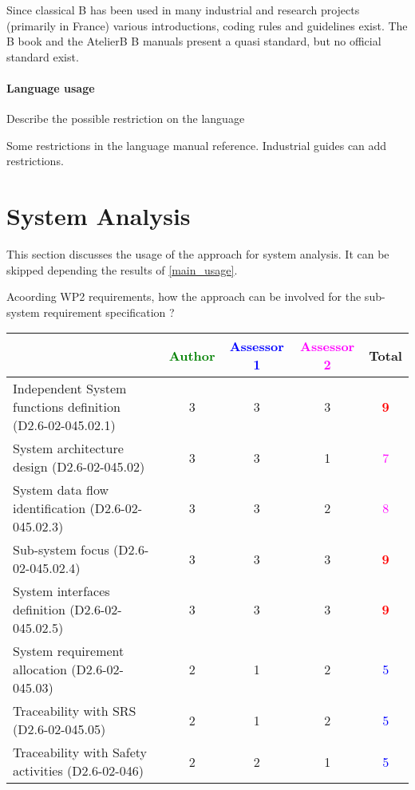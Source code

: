 \begin{assessor2}
Since classical B has been used in many industrial and research projects (primarily in France) various introductions, coding rules and guidelines exist. The B book and the AtelierB B manuals present a quasi standard, but no official standard exist.
\end{assessor2}

\paragraph{Language usage} Describe the possible restriction on the language
\begin{author_comment}
Some restrictions in the language manual reference. Industrial guides can add restrictions.
\end{author_comment}

\section{System Analysis}
This section discusses the usage of the approach for system analysis.
It can be skipped depending the results of \ref{main_usage}.

Acoording WP2 requirements, how the approach can be involved for the sub-system requirement specification ?

\begin{tabular}{|l | c | c | c | c|}
\hline
& \textcolor{green}{Author} & \textcolor{blue}{Assessor 1} & \textcolor{magenta}{Assessor 2} & Total \\
\hline
Independent System functions definition (D2.6-02-045.02.1)  & 3    & 3    & 3    & \textcolor{red}{\textbf{9}} \\
\hline 
System architecture design (D2.6-02-045.02) & 3    & 3    & 1    & \textcolor{magenta}{7} \\
\hline
System data flow identification (D2.6-02-045.02.3)  & 3    & 3    & 2    & \textcolor{magenta}{8} \\
\hline
Sub-system focus (D2.6-02-045.02.4)  & 3    & 3    & 3    & \textcolor{red}{\textbf{9}} \\
\hline
System interfaces definition (D2.6-02-045.02.5)  & 3    & 3    & 3    & \textcolor{red}{\textbf{9}} \\
\hline
System requirement allocation (D2.6-02-045.03)  & 2    & 1    & 2    & \textcolor{blue}{5} \\
\hline
Traceability with SRS (D2.6-02-045.05)  & 2    & 1    & 2    & \textcolor{blue}{5} \\
\hline
Traceability with Safety activities (D2.6-02-046)  & 2    & 2    & 1    & \textcolor{blue}{5} \\
\hline
\end{tabular}

